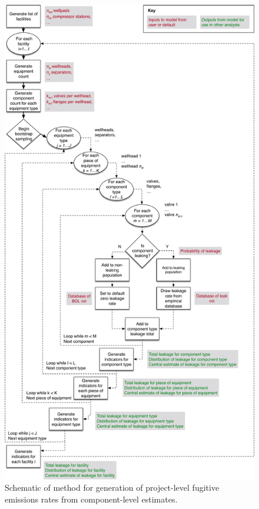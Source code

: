 \documentclass[11pt]{report}
\begin{document}
\begin{figure}[t]
\includegraphics[width=0.8\columnwidth]{images/FugitivesBootstrapLogicalFlow_v2.pdf}
\caption{Schematic of method for generation of project-level fugitive emissions rates from component-level estimates.}
\label{fig:Component_VF_Flowchart}
\end{figure}
\end{document}
